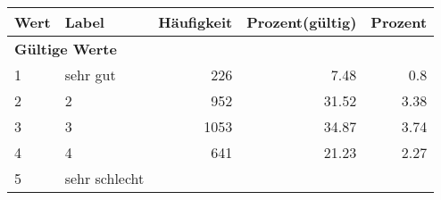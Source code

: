      \begin{longtable}{lXrrr}
     \toprule
     \textbf{Wert} & \textbf{Label} & \textbf{Häufigkeit} & \textbf{Prozent(gültig)} & \textbf{Prozent} \\
     \endhead
     \midrule
     \multicolumn{5}{l}{\textbf{Gültige Werte}}\\

     1 &
     \multicolumn{1}{X}{ sehr gut   } &


       \num{226} &
       \num[round-mode=places,round-precision=2]{7.48} &
         \num[round-mode=places,round-precision=2]{0.8} \\

     2 &
     \multicolumn{1}{X}{ 2   } &


       \num{952} &
       \num[round-mode=places,round-precision=2]{31.52} &
         \num[round-mode=places,round-precision=2]{3.38} \\

     3 &
     \multicolumn{1}{X}{ 3   } &


       \num{1053} &
       \num[round-mode=places,round-precision=2]{34.87} &
         \num[round-mode=places,round-precision=2]{3.74} \\

     4 &
     \multicolumn{1}{X}{ 4   } &


       \num{641} &
       \num[round-mode=places,round-precision=2]{21.23} &
         \num[round-mode=places,round-precision=2]{2.27} \\

     5 &
     \multicolumn{1}{X}{ sehr schlecht   } &



\end{longtable}
